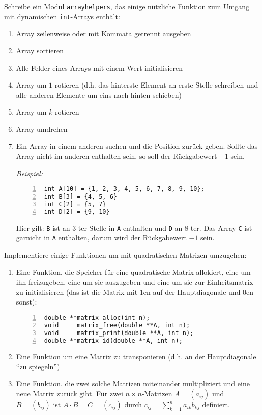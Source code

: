 \documentclass{uebungszettel}
\begin{document}
\begin{aufg}
Schreibe ein Modul \verb|arrayhelpers|, das einige nützliche Funktion zum Umgang mit dynamischen \verb|int|-Arrays enthält:
\begin{enumerate}
\item Array zeilenweise oder mit Kommata getrennt ausgeben
\item Array sortieren
\item Alle Felder eines Arrays mit einem Wert initialisieren
\item Array um $1$ rotieren (d.h. das hinterste Element an erste Stelle schreiben und alle anderen Elemente um eins nach hinten schieben)
\item Array um $k$ rotieren 
\item Array umdrehen
\item Ein Array in einem anderen suchen und die Position zurück geben. Sollte das Array nicht im anderen enthalten sein, so soll der Rückgabewert $-1$ sein.

\emph{Beispiel:} 
\begin{codelisting}
\begin{lstlisting}[numbers=left,numberstyle=\tiny,frame=tlrb]
int A[10] = {1, 2, 3, 4, 5, 6, 7, 8, 9, 10};
int B[3] = {4, 5, 6}
int C[2] = {5, 7}
int D[2] = {9, 10}
\end{lstlisting}
\end{codelisting}
Hier gilt: \verb|B| ist an $3$-ter Stelle in \verb|A| enthalten und \verb|D| an $8$-ter. Das Array \verb|C| ist garnicht in \verb|A| enthalten, darum wird der Rückgabewert $-1$ sein.
\end{enumerate}
\end{aufg}

\begin{aufg} Implementiere einige Funktionen um mit quadratischen Matrizen umzugehen:
\begin{enumerate}
\item Eine Funktion, die Speicher für eine quadratische Matrix allokiert, eine um ihn freizugeben, eine um sie auszugeben und eine um sie zur Einheitsmatrix zu initialisieren (das ist die Matrix mit $1$en auf der Hauptdiagonale und $0$en sonst):
\begin{codelisting}
\begin{lstlisting}[numbers=left,numberstyle=\tiny,frame=tlrb]
double **matrix_alloc(int n);
void     matrix_free(double **A, int n);
void     matrix_print(double **A, int n);
double **matrix_id(double **A, int n);
\end{lstlisting}
\end{codelisting}
\item Eine Funktion um eine Matrix zu transponieren (d.h. an der Hauptdiagonale ``zu spiegeln'')
\item Eine Funktion, die zwei solche Matrizen miteinander multipliziert und eine neue Matrix zurück gibt. Für zwei $n \times n$-Matrizen $A = (a_{ij})$ und $B = (b_{ij})$ ist $A \cdot B = C = (c_{ij})$ durch $c_{ij} = \sum_{k=1}^n a_{ik} b_{kj}$ definiert.
\end{enumerate}
\end{aufg}
\end{document}
